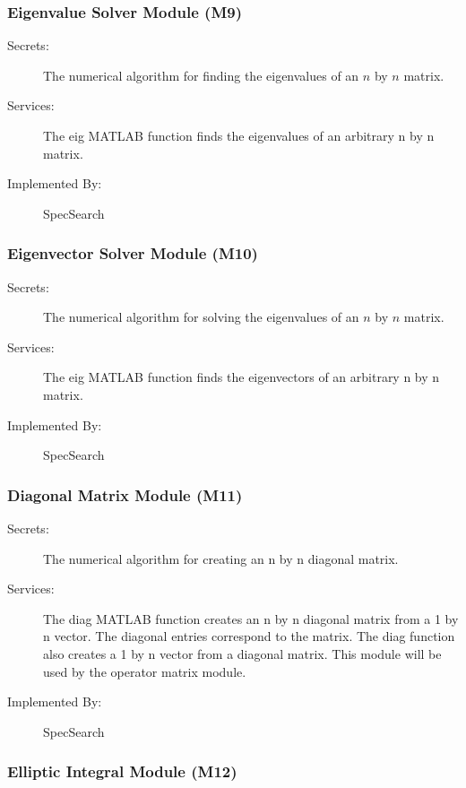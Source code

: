 \documentclass[12pt, titlepage]{article}
\begin{document}
\subsubsection{Eigenvalue Solver Module (M9)} 

\begin{description}
	\item[Secrets:] The numerical algorithm for finding the eigenvalues of an 
	$n$ by $n$ matrix.
	\item[Services:] The eig MATLAB function finds the eigenvalues of an 
	arbitrary n by n matrix.
	\item[Implemented By:] SpecSearch
\end{description} 

\subsubsection{Eigenvector Solver Module (M10)} 

\begin{description}
	\item[Secrets:] The numerical algorithm for solving the eigenvalues of an 
	$n$ by $n$ matrix.
	\item[Services:] The eig MATLAB function finds the eigenvectors of an 
	arbitrary n by n matrix. 
	\item[Implemented By:] SpecSearch
\end{description} 

\subsubsection{Diagonal Matrix Module (M11)} 

\begin{description}
	\item[Secrets:] The numerical algorithm for creating an n by n diagonal 
	matrix.
	\item[Services:] The diag MATLAB function creates an n by n diagonal matrix 
	from a 1 by n vector. The diagonal entries correspond to the matrix. The 
	diag function also creates a 1 by n vector from a diagonal matrix. This 
	module will be used by the operator matrix module. 
	\item[Implemented By:] SpecSearch
\end{description} 

\subsubsection{Elliptic Integral Module (M12)} 
\end{document}
